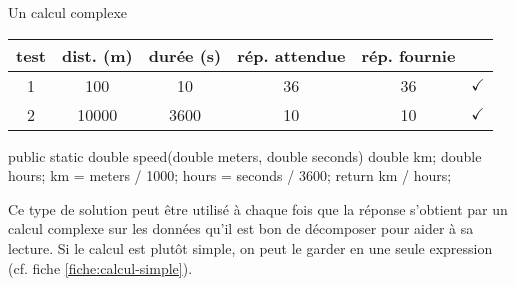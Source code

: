 \begin{Fiche}{Un calcul complexe}
	\begin{center}
		\begin{tabular}{|c|cccc|c|}
		\hline
			\rowcolor{black!40}
		test \no & dist. (m) & durée (s) & rép. attendue 
			& rép. fournie & {} \\
		\hline 
		1 & 100   & 10   & 36 & 36 & {\color{ForestGreen}$\checkmark$} \\\hline
		2 & 10000 & 3600 & 10 & 10 & {\color{ForestGreen}$\checkmark$} \\\hline
		\end{tabular}
	\end{center}								


\begin{java}
public static double speed(double meters, double seconds){
	double km;
	double hours;
	km = meters / 1000;
	hours = seconds / 3600;
	return km / hours;
}
\end{java}


	Ce type de solution peut être utilisé à chaque fois que la réponse s’obtient
	par un calcul complexe sur les données qu’il est bon de décomposer pour
	aider à sa lecture.  Si le calcul est plutôt simple, on peut le garder en
	une seule expression (cf. fiche \vref{fiche:calcul-simple}).
	
\end{Fiche}
